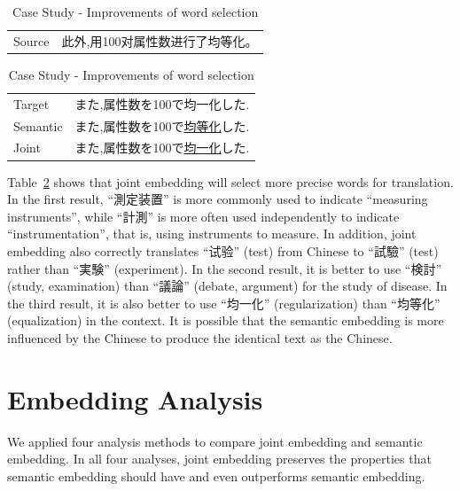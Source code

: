 \begin{table}[h]
    \begin{CJK}{UTF8}{gbsn}
        \begin{tabularx}{\textwidth}{p{1.2cm}b}
            Source & 此外,用100对属性数进行了均等化。 \\
        \end{tabularx}
    \end{CJK}

    \begin{CJK}{UTF8}{long}
        \begin{tabularx}{\textwidth}{p{1.2cm}b}
            Target & また,属性数を100で均一化した. \\
            Semantic & また,属性数を100で\underline{均等化}した. \\
            Joint & また,属性数を100で\underline{均一化}した. \\\midrule
        \end{tabularx}
    \end{CJK}

    \caption{Case Study - Improvements of word selection}
    \label{tab:case_study4}
\end{table}

\begin{CJK}{UTF8}{long}
    Table~\ref{tab:case_study4} shows that joint embedding will select more precise words for translation. In the first result, ``測定装置'' is more commonly used to indicate ``measuring instruments'', while ``計測'' is more often used independently to indicate ``instrumentation'', that is, using instruments to measure. In addition, joint embedding also correctly translates ``试验'' (test) from Chinese to ``試驗'' (test) rather than ``実験'' (experiment). In the second result, it is better to use ``検討'' (study, examination) than ``議論'' (debate, argument) for the study of disease. In the third result, it is also better to use ``均一化'' (regularization) than ``均等化'' (equalization) in the context. It is possible that the semantic embedding is more influenced by the Chinese to produce the identical text as the Chinese.
\end{CJK}

\section{Embedding Analysis} \label{sec:analysis}

We applied four analysis methods to compare joint embedding and semantic embedding. In all four analyses, joint embedding preserves the properties that semantic embedding should have and even outperforms semantic embedding.

